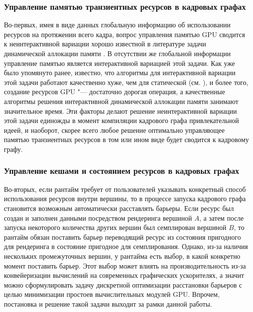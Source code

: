 \subsubsection{Управление памятью транзиентных ресурсов в кадровых графах}
Во-первых, имея в виде данных глобальную информацию об использовании ресурсов на протяжении всего кадра, вопрос управления памятью GPU сводится к неинтерактивной вариации хорошо известной в литературе задачи динамической аллокации памяти \cite[с. 226]{10.5555/574848}.
В отсутствии же глобальной информации управление памятью является интерактивной вариацией этой задачи.
Как уже было упомянуто ранее, известно, что алгоритмы для интерактивной вариации этой задачи работают качественно хуже, чем для статической (см. \cite{robson1971estimate}), и более того, создание ресурсов GPU "--- достаточно дорогая операция, а качественные алгоритмы решения интерактивной динамической аллокации памяти занимают значительное время.
Эти факторы делают решение неинтерактивной вариации этой задачи единожды в момент компиляции кадрового графа привлекательной идеей, и наоборот, скорее всего любое решение оптимально управляющее памятью транзиентных ресурсов в том или ином виде будет сводится к кадровому графу.

\subsubsection{Управление кешами и состоянием ресурсов в кадровых графах}
Во-вторых, если рантайм требует от пользователей указывать конкретный способ использования ресурсов внутри вершины, то в процессе запуска кадрового графа становится возможным автоматически расставлять барьеры.
Если ресурс был создан и заполнен данными посредством рендеринга вершиной $A$, а затем после запуска некоторого количества других вершин был семплирован вершиной $B$, то рантайм обязан поставить барьер переводящий ресурс из состояния пригодного для рендеринга в состояние пригодное для семплирования.
Однако, из-за наличия нескольких промежуточных вершин, у рантайма есть выбор, в какой конкретно момент поставить барьер.
Этот выбор может влиять на производительность из-за конвейеризации вычислений на современных графических ускорителях, а значит можно сформулировать задачу дискретной оптимизации расстановки барьеров с целью минимизации простоев вычислительных модулей GPU.
Впрочем, постановка и решение такой задачи выходит за рамки данной работы.

